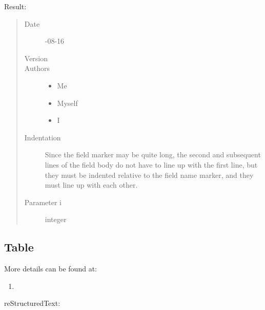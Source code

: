 \documentclass[letterpaper,12pt,english]{sphinxmanual}
\begin{document}
Result:
\begin{quote}\begin{description}
\item[{Date}] -08-16

\item[{Version}] 

\item[{Authors}] \leavevmode\begin{itemize}
\item {} 
Me

\item {} 
Myself

\item {} 
I

\end{itemize}

\item[{Indentation}] \leavevmode
Since the field marker may be quite long, the second
and subsequent lines of the field body do not have to line up
with the first line, but they must be indented relative to the
field name marker, and they must line up with each other.

\item[{Parameter i}] \leavevmode
integer

\end{description}\end{quote}


\subsection{Table}
\label{\detokenize{rtxt:table}}
More details can be found at: 
\begin{enumerate}
\def\theenumi{\arabic{enumi}}
\def\labelenumi{\theenumi .}
\makeatletter\def\p@enumii{\p@enumi \theenumi .}\makeatother
\item {} 

\end{enumerate}

reStructuredText:
\end{document}
